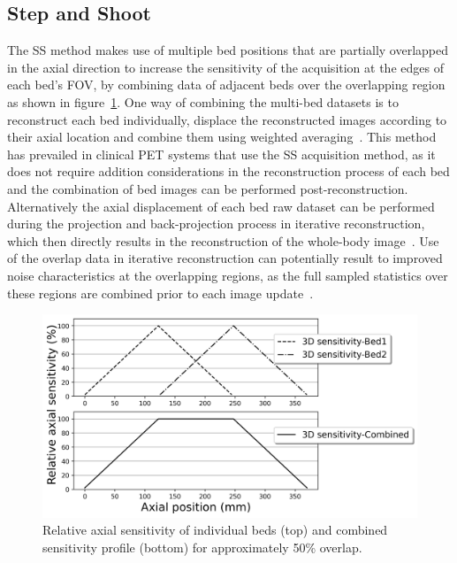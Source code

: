 \subsection{Step and Shoot}
\label{WB_Static_SS}
The SS method makes use of multiple bed positions that are partially overlapped in the axial direction to increase the sensitivity of the acquisition at the edges of each bed's FOV, by combining data of adjacent beds over the overlapping region as shown in figure~\ref{fig3_1:fullOverlap}. One way of combining the multi-bed datasets is to reconstruct each bed individually, displace the reconstructed images according to their axial location and combine them using weighted averaging~\cite{Schubert1996}. This method has prevailed in clinical PET systems that use the SS acquisition method, as it does not require addition considerations in the reconstruction process of each bed and the combination of bed images can be performed post-reconstruction. Alternatively the axial displacement of each bed raw dataset can be performed during the projection and back-projection process in iterative reconstruction, which then directly results in the reconstruction of the whole-body image~\cite{Ross2004}. Use of the overlap data in iterative reconstruction can potentially result to improved noise characteristics at the overlapping regions, as the full sampled statistics over these regions are combined prior to each image update~\cite{Ross2004,Stute2014}. 
%
\begin{figure} [ht!]
\centering
\includegraphics[scale=0.5,angle=0]{3_Results/3_1_DWB_Optimization/figures/SensitivityProfiles_fullOverlap.png}
\caption{Relative axial sensitivity of individual beds (top) and combined sensitivity profile (bottom) for approximately 50\% overlap.} 
\label{fig3_1:fullOverlap}
\end{figure}
